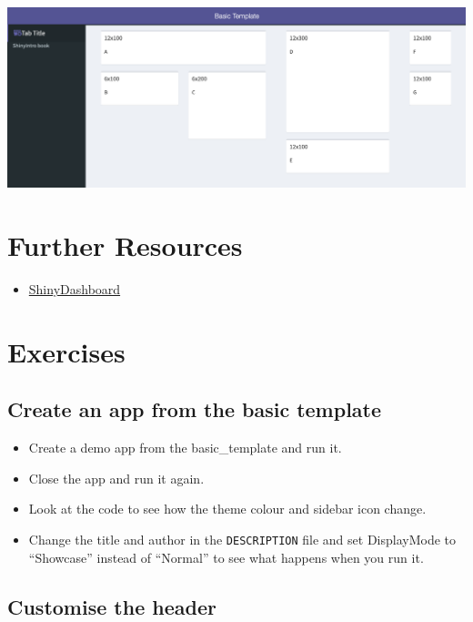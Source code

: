 \documentclass[
]{book}
\providecommand{\tightlist}{%
  \setlength{\itemsep}{0pt}\setlength{\parskip}{0pt}}
\begin{document}
\includegraphics{images/sdb_column_layout.png}

\hypertarget{resources-shinydashboard}{%
\section{Further Resources}\label{resources-shinydashboard}}

\begin{itemize}
\tightlist
\item
  \href{https://rstudio.github.io/shinydashboard/}{ShinyDashboard}
\end{itemize}

\hypertarget{exercises-shinydashboard}{%
\section{Exercises}\label{exercises-shinydashboard}}

\hypertarget{create-an-app-from-the-basic-template}{%
\subsection{Create an app from the basic template}\label{create-an-app-from-the-basic-template}}

\begin{itemize}
\tightlist
\item
  Create a demo app from the basic\_template and run it.
\item
  Close the app and run it again.
\item
  Look at the code to see how the theme colour and sidebar icon change.
\item
  Change the title and author in the \texttt{DESCRIPTION} file and set DisplayMode to ``Showcase'' instead of ``Normal'' to see what happens when you run it.
\end{itemize}

\hypertarget{customise-the-header}{%
\subsection{Customise the header}\label{customise-the-header}}
\end{document}
